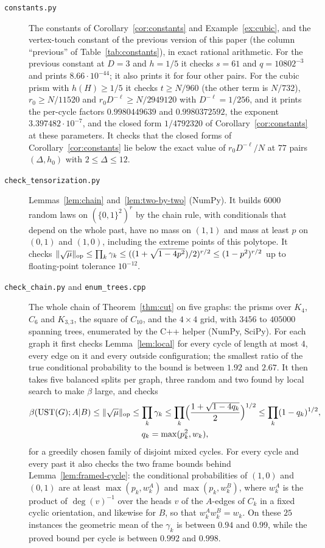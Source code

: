 \begin{description}
\item[\texttt{constants.py}] The constants of Corollary~\ref{cor:constants} and Example~\ref{ex:cubic}, and the vertex-touch constant of the previous version of this paper (the column ``previous'' of Table~\ref{tab:constants}), in exact rational arithmetic. For the previous constant at $D=3$ and $h=1/5$ it checks $s=61$ and $q=10802^{-3}$ and prints $8.66\cdot10^{-44}$; it also prints it for four other pairs. For the cubic prism with $h(H)\ge1/5$ it checks $t\ge N/960$ (the other term is $N/732$), $r_0\ge N/11520$ and $r_0D^{-\ell}\ge N/2949120$ with $D^{-\ell}=1/256$, and it prints the per-cycle factors $0.9980449639$ and $0.9980372592$, the exponent $3.397482\cdot10^{-7}$, and the closed form $1/4792320$ of Corollary~\ref{cor:constants} at these parameters. It checks that the closed forms of Corollary~\ref{cor:constants} lie below the exact value of $r_0D^{-\ell}/N$ at $77$ pairs $(\Delta,h_0)$ with $2\le\Delta\le12$.

\item[\texttt{check\_tensorization.py}] Lemmas~\ref{lem:chain} and~\ref{lem:two-by-two} (NumPy). It builds $6000$ random laws on $(\{0,1\}^2)^r$ by the chain rule, with conditionals that depend on the whole past, have no mass on $(1,1)$ and mass at least $p$ on $(0,1)$ and $(1,0)$, including the extreme points of this polytope. It checks $\lVert \sqrt\mu\rVert_{\mathrm{op}}\le\prod_k\gamma_k\le((1+\sqrt{1-4p^2})/2)^{r/2}\le(1-p^2)^{r/2}$ up to floating-point tolerance $10^{-12}$.

\item[\texttt{check\_chain.py} and \texttt{enum\_trees.cpp}] The whole chain of Theorem~\ref{thm:cut} on five graphs: the prisms over $K_4$, $C_6$ and $K_{3,3}$, the square of $C_{10}$, and the $4\times4$ grid, with $3456$ to $405000$ spanning trees, enumerated by the C++ helper (NumPy, SciPy). For each graph it first checks Lemma~\ref{lem:local} for every cycle of length at most $4$, every edge on it and every outside configuration; the smallest ratio of the true conditional probability to the bound is between $1.92$ and $2.67$. It then takes five balanced splits per graph, three random and two found by local search to make $\beta$ large, and checks
\begin{gather*}
  \beta(\mathrm{UST}(G);A|B)\le\lVert \sqrt\mu\rVert_{\mathrm{op}}\le\prod_k\gamma_k\le\prod_k\Bigl(\frac{1+\sqrt{1-4q_k}}2\Bigr)^{1/2}\le\prod_k(1-q_k)^{1/2},\\
  q_k=\max(p_k^2,w_k),
\end{gather*}
for a greedily chosen family of disjoint mixed cycles. For every cycle and every past it also checks the two frame bounds behind Lemma~\ref{lem:framed-cycle}: the conditional probabilities of $(1,0)$ and $(0,1)$ are at least $\max(p_k,w^A_k)$ and $\max(p_k,w^B_k)$, where $w^A_k$ is the product of $\deg(v)^{-1}$ over the heads $v$ of the $A$-edges of $C_k$ in a fixed cyclic orientation, and likewise for $B$, so that $w^A_kw^B_k=w_k$. On these $25$ instances the geometric mean of the $\gamma_k$ is between $0.94$ and $0.99$, while the proved bound per cycle is between $0.992$ and $0.998$.


\end{description}
